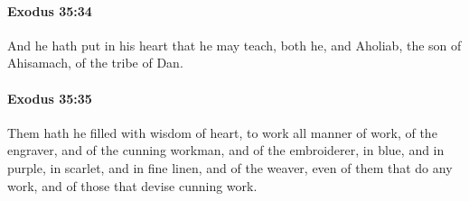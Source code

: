 		\paragraph{Exodus 35:34} %
			\label{EXODUS-35-34}

			And he hath put in his heart that he may teach, both he, and Aholiab, the son of Ahisamach, of the tribe of Dan.


		\paragraph{Exodus 35:35} %
			\label{EXODUS-35-35}

			Them hath he filled with wisdom of heart, to work all manner of work, of the engraver, and of the cunning workman, and of the embroiderer, in blue, and in purple, in scarlet, and in fine linen, and of the weaver, even of them that do any work, and of those that devise cunning work.

